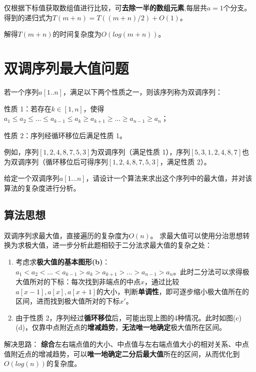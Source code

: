\documentclass{article}
\begin{document}
仅根据下标值获取数组值进行比较，可\textbf{去除一半的数组元素},每层共$a=1$个分支。得到的递归式为$T(m+n)=T((m+n)/2)+O(1)$。

解得$T(m+n)$的时间复杂度为$O(log(m+n))$。



\section{双调序列最大值问题}

若一个序列$a[1..n]$，满足以下两个性质之一，则该序列称为双调序列：

\noindent
{}
\setlength{\hangindent}{48pt}
\hspace{45pt}性质 1：若存在$k\in [1,n]$，使得$a_1 \leq a_2 \leq ... \leq a_{k-1} \leq a_k \geq a_{k+1} \geq ... \geq a_{n-1} \geq a_n$；

\noindent
{}
\setlength{\hangindent}{48pt}
\hspace{45pt}性质 2：序列经循环移位后满足性质 1。

例如，序列$[1, 2, 4, 8, 7, 5, 3]$为双调序列（满足性质 1），序列$[5, 3, 1, 2, 4, 8, 7]$也为双调序列（循环移位后可得序列$[1, 2, 4, 8, 7, 5, 3]$，满足性质 2）。

给定一个双调序列$a[1...n]$，请设计一个算法来求出这个序列中的最大值，并对该算法的复杂度进行分析。

\subsection{算法思想}

双调序列求最大值，直接遍历的复杂度为$O(n)$。
求最大值可以使用分治思想转换为求极大值，进一步分析此题相较于二分法求最大值的复杂之处：
\begin{enumerate}
    \item 考虑求\textbf{极大值的基本图形(b)}：$a_1 < a_2 < ... < a_{k-1} > a_k > a_{k+1} > ... > a_{n-1} > a_n$。此时二分法可以求得极大值所对的下标：每次找到非端点的中点$x$，通过比较$a[x-1],a[x],a[x+1]$的大小，判断\textbf{单调性}，即可逐步缩小极大值所在的区间，进而找到极大值所对的下标$x'$。
    \item 由于性质 2，序列经过\textbf{循环移位}后，可能出现上图的4种情况。此时如图(c)(d)，仅靠中点附近点的\textbf{增减趋势}，\textbf{无法唯一地确定}极大值所在区间。
\end{enumerate}

解决思路：
\textbf{综合}左右端点值的大小、中点值与左右端点值大小的相对关系、中点值附近点的增减趋势，可以\textbf{唯一地确定二分后最大值}所在的区间，从而优化到$O(log(n))$的复杂度。\\
\end{document}
